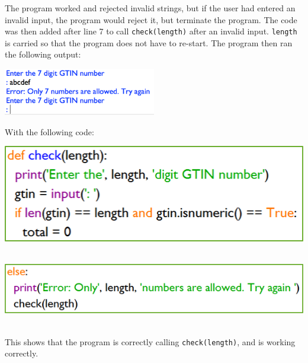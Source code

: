 \documentclass[a4paper]{article}
\begin{document}
The program worked and rejected invalid strings, but if the user had entered an invalid input, the program would reject it, but terminate the program. The code was then added after line 7 to call \verb|check(length)| after an invalid input. \verb|length| is carried so that the program does not have to re-start. The program then ran the following output: \par
\noindent\includegraphics[width=0.5\textwidth, left, width=\linewidth, frame]{task1_check()functionDEV2.png} \par
With the following code: \par
\noindent\includegraphics{task1_check()function2.png} ~ \par
\noindent\includegraphics{task1_check()function3.png} ~\par
This shows that the program is correctly calling \verb|check(length)|, and is working correctly.
\newpage
\end{document}
